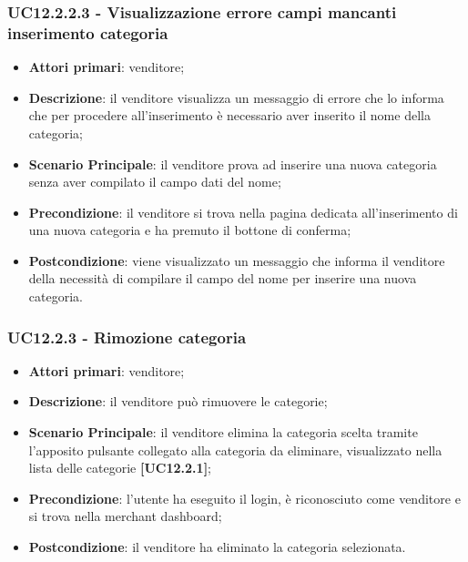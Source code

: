 \subsubsection{UC12.2.2.3 - Visualizzazione errore campi mancanti inserimento categoria}
\begin{itemize}
\item \textbf{Attori primari}: venditore;
\item \textbf{Descrizione}: il venditore visualizza un messaggio di errore che lo informa che per procedere all'inserimento è necessario aver inserito il nome della categoria;
\item \textbf{Scenario Principale}: il venditore prova ad inserire una nuova categoria senza aver compilato il campo dati del nome;
\item \textbf{Precondizione}: il venditore si trova nella pagina dedicata all'inserimento di una nuova categoria e ha premuto il bottone di conferma;
\item \textbf{Postcondizione}: viene visualizzato un messaggio che informa il venditore della necessità di compilare il campo del nome per inserire una nuova categoria.
\end{itemize}

\subsubsection{UC12.2.3 - Rimozione categoria}
\begin{itemize}
\item \textbf{Attori primari}: venditore;
\item \textbf{Descrizione}: il venditore può rimuovere le categorie;
\item \textbf{Scenario Principale}: il venditore elimina la categoria scelta tramite l'apposito pulsante collegato alla categoria da eliminare, visualizzato nella lista delle categorie \textbf{[UC12.2.1]};
\item \textbf{Precondizione}: l'utente ha eseguito il login, è riconosciuto come venditore e si trova nella merchant dashboard;
\item \textbf{Postcondizione}: il venditore ha eliminato la categoria selezionata.
\end{itemize}


